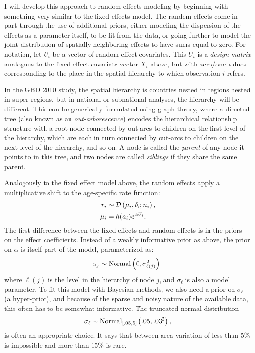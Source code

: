 I will develop this approach to random effects modeling by beginning
with something very similar to the fixed-effects model.  The random
effects come in part through the use of additional priors, either
modeling the dispersion of the effects as a parameter itself, to be
fit from the data, or going further to model the joint distribution of
spatially neighboring effects to have sums equal to zero.  For
notation, let $U_i$ be a vector of random effect covariates.  This
$U_i$ is a \emph{design matrix} analogous to the fixed-effect
covariate vector $X_i$ above, but with zero/one values corresponding
to the place in the spatial hierarchy to which observation $i$ refers.

In the GBD 2010 study, the spatial hierarchy is countries nested in regions
nested in super-regions, but in national or subnational analyses, the
hierarchy will be different. This can be generically formulated using
graph theory, where a directed tree (also known as an
\emph{out-arborescence}) encodes the hierarchical relationship
structure with a root node connected by out-arcs to children on the
first level of the hierarchy, which are each in turn connected by
out-arcs to children on the next level of the hierarchy, and so on.  A
node is called the \emph{parent} of any node it points to in this
tree, and two nodes are called \emph{siblings} if they share the same
parent.


Analogously to the fixed effect model above, the random effects apply
a multiplicative shift to the age-specific rate function:
\begin{align*}
r_i &\sim \mathcal{D}\left(\mu_i, \delta_i; n_i\right),\\
\mu_i &= h(a_i)e^{\alpha U_i}.
\end{align*}
The first difference between the fixed effects and random effects is
in the priors on the effect coefficients.  Instead of a weakly
informative prior as above, the prior on $\alpha$ is itself part of
the model, parameterized as:
\[
\alpha_j \sim \operatorname{Normal}\left(0, \sigma_{\ell(j)}^2\right),
\]
where $\ell(j)$ is the level in the hierarchy of node $j$, and
$\sigma_\ell$ is also a model parameter. To fit this model with
Bayesian methods, we also need a prior on $\sigma_\ell$ (a
hyper-prior), and because of the sparse and noisy nature of the
available data, this often has to be somewhat informative.  The
truncated normal distribution
\[
\sigma_\ell \sim \operatorname{Normal}_{[.05,5]}\left(.05, .03^2\right),
\]
is often an appropriate choice. It says that between-area variation of
less than 5\% is impossible and more than 15\% is rare.

